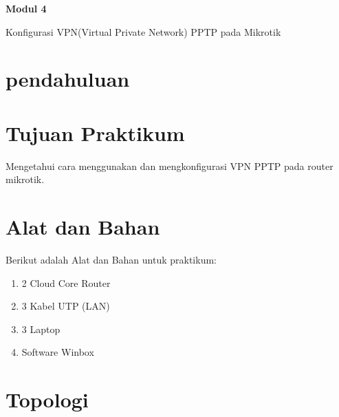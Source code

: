 \newpage
\setcounter{section}{0}
\renewcommand{\thesection}{\arabic{section}}

\begin{center}
    \Huge
    \textbf{Modul 4}
    
    Konfigurasi VPN(Virtual Private Network) PPTP pada Mikrotik

\end{center}


\section{pendahuluan}


\section{Tujuan Praktikum}

Mengetahui cara menggunakan dan mengkonfigurasi VPN PPTP pada router mikrotik.

\section{Alat dan Bahan}

Berikut adalah Alat dan Bahan untuk praktikum:

\begin{enumerate}
    \item 2 Cloud Core Router
    \item 3 Kabel UTP (LAN)
    \item 3 Laptop
    \item Software Winbox
\end{enumerate}

\section{Topologi}


